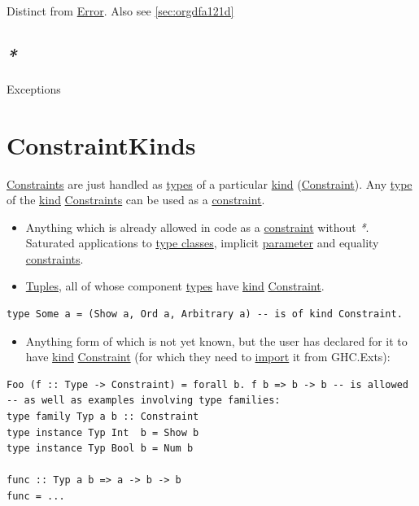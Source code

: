 \documentclass[a4paper,14pt,oneside]{book}
\begin{document}
Distinct from \hyperref[org3efb327]{Error}. Also see \ref{sec:orgdfa121d}

\section{\emph{*}}
\label{sec:org6bce53c}

\label{org985f876}Exceptions

\chapter{\label{org9db2d69}ConstraintKinds}
\label{sec:org2d6aacf}
\hyperref[orgc2f3aeb]{Constraints} are just handled as \hyperref[orga6937e6]{types} of a particular \hyperref[org1e14168]{kind} (\hyperref[org8e97a14]{Constraint}).
Any \hyperref[org39c076a]{type} of the \hyperref[org1e14168]{kind} \hyperref[orgc2f3aeb]{Constraints} can be used as a \hyperref[org8e97a14]{constraint}.
\begin{itemize}
\item Anything which is already allowed in code as a \hyperref[org8e97a14]{constraint} without \emph{*}. Saturated applications to \hyperref[org5b5df32]{type classes}, implicit \hyperref[orgcabb2ee]{parameter} and equality \hyperref[orgc2f3aeb]{constraints}.
\item \hyperref[orgbb2cd8c]{Tuples}, all of whose component \hyperref[orga6937e6]{types} have \hyperref[org1e14168]{kind} \hyperref[org8e97a14]{Constraint}.
\end{itemize}
\begin{verbatim}
type Some a = (Show a, Ord a, Arbitrary a) -- is of kind Constraint.
\end{verbatim}
\begin{itemize}
\item Anything form of which is not yet known, but the user has declared for it to have \hyperref[org1e14168]{kind} \hyperref[org8e97a14]{Constraint} (for which they need to \hyperref[orgdfdadad]{import} it from GHC.Exts):
\end{itemize}
\begin{verbatim}
Foo (f :: Type -> Constraint) = forall b. f b => b -> b -- is allowed
-- as well as examples involving type families:
type family Typ a b :: Constraint
type instance Typ Int  b = Show b
type instance Typ Bool b = Num b

func :: Typ a b => a -> b -> b
func = ...
\end{verbatim}
\end{document}
